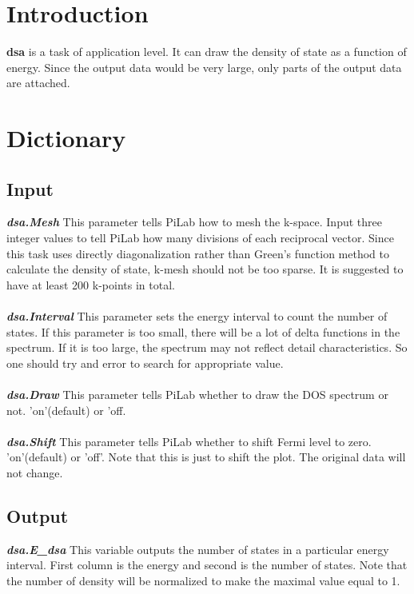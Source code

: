 \documentclass[10pt,a4paper]{article}
\begin{document}
\section{Introduction}
\textbf{dsa} is a task of application level. It can draw the density of state as a function of energy. Since the output data would be very large, only parts of the output data are attached. 

\section{Dictionary}

\subsection{Input}
\textit{\textbf{dsa.Mesh}} This parameter tells PiLab how to mesh the k-space. Input three integer values to tell PiLab how many divisions of each reciprocal vector. Since this task uses directly diagonalization rather than Green's function method to calculate the density of state, k-mesh should not be too sparse. It is suggested to have at least 200 k-points in total. \\ \\
\textit{\textbf{dsa.Interval}} This parameter sets the energy interval to count the number of states. If this parameter is too small, there will be a lot of delta functions in the spectrum. If it is too large, the spectrum may not reflect detail characteristics. So one should try and error to search for appropriate value. \\ \\
\textit{\textbf{dsa.Draw}} This parameter tells PiLab whether to draw the DOS spectrum or not. 'on'(default) or 'off. \\ \\
\textit{\textbf{dsa.Shift}} This parameter tells PiLab whether to shift Fermi level to zero. 'on'(default) or 'off'. Note that this is just to shift the plot. The original data will not change.


\subsection{Output}
\textit{\textbf{dsa.E\_dsa}} This variable outputs the number of states in a particular energy interval. First column is the energy and second is the number of states. Note that the number of density will be normalized to make the maximal value equal to 1.  
\end{document}

